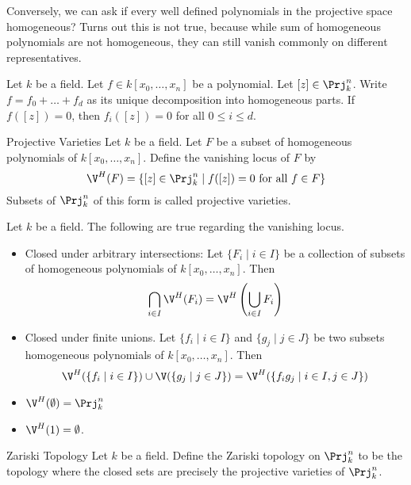 \documentclass[a4paper]{article}
\begin{document}
Conversely, we can ask if every well defined polynomials in the projective space homogeneous? Turns out this is not true, because while sum of homogeneous polynomials are not homogeneous, they can still vanish commonly on different representatives. 

\begin{lmm}{}{} Let $k$ be a field. Let $f\in k[x_0,\dots,x_n]$ be a polynomial. Let $[z]\in\Prj_k^n$. Write $f=f_0+\dots+f_d$ as its unique decomposition into homogeneous parts. If $f([z])=0$, then $f_i([z])=0$ for all $0\leq i\leq d$. 
\end{lmm}

\begin{defn}{Projective Varieties}{} Let $k$ be a field. Let $F$ be a subset of homogeneous polynomials of $k[x_0,\dots,x_n]$. Define the vanishing locus of $F$ by $$\V^H(F)=\{[z]\in\Prj_k^n\;|\;f([z])=0\text{ for all }f\in F\}$$ Subsets of $\Prj_k^n$ of this form is called projective varieties. 
\end{defn}

\begin{prp}{}{} Let $k$ be a field. The following are true regarding the vanishing locus. 
\begin{itemize}
\item Closed under arbitrary intersections: Let $\{F_i\;|\;i\in I\}$ be a collection of subsets of homogeneous polynomials of $k[x_0,\dots,x_n]$. Then $$\bigcap_{i\in I}\V^H(F_i)=\V^H\left(\bigcup_{i\in I}F_i\right)$$
\item Closed under finite unions. Let $\{f_i\;|\;i\in I\}$ and $\{g_j\;|\;j\in J\}$ be two subsets homogeneous polynomials of $k[x_0,\dots,x_n]$. Then $$\V^H(\{f_i\;|\;i\in I\})\cup\V(\{g_j\;|\;j\in J\})=\V^H(\{f_ig_j\;|\;i\in I, j\in J\})$$
\item $\V^H(\emptyset)=\Prj_k^n$
\item $\V^H(1)=\emptyset$. 
\end{itemize}
\end{prp}

\begin{defn}{Zariski Topology}{} Let $k$ be a field. Define the Zariski topology on $\Prj_k^n$ to be the topology where the closed sets are precisely the projective varieties of $\Prj_k^n$. 
\end{defn}
\end{document}
